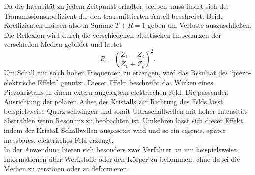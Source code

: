 Da die Intensität zu jedem Zeitpunkt erhalten bleiben muss findet sich der Transmissionskoeffizient der den transmittierten Anteil beschreibt.
Beide Koeffizienten müssen also in Summe $T+R=1$ geben um Verluste auszuschließen.
Die Reflexion wird durch die verschiedenen akustischen Impedanzen der verschieden Medien gebildet und lautet
\begin{equation*}
    R= \left( \frac{Z_1 - Z_2}{Z_1 + Z_2}\right)^2.
\end{equation*}
Um Schall mit solch hohen Frequenzen zu erzeugen, wird das Resultat des \enquote{piezo-elektrische Effekt} genutzt.
Dieser Effekt beschreibt das Wirken eines Piezokristalls in einem extern angelegtem elektrischen Feld. Die passenden Ausrichtung der polaren Achse des Kristalls zur Richtung des Felds 
lässt beispielsweise Quarz schwingen und somit Ultraschallwellen mit hoher Intensität abstrahlen wenn Resonanz zu beobachten ist.  
Umkehren lässt sich dieser Effekt, indem der Kristall Schallwellen ausgesetzt wird und so ein eigenes, später messbares, elektrisches Feld erzeugt. 
\\
\newline
In der Anwendung bieten sich besonders zwei Verfahren an um beispielsweise Informationen über Werkstoffe oder den Körper zu bekommen, ohne dabei 
die Medien zu zerstören oder zu deformieren.
\\
\newline
